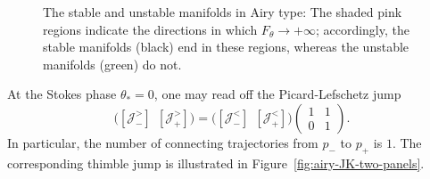 \documentclass[11pt]{amsart}
\theoremstyle{plain}
\newcommand{\J}{\mathcal J}
\begin{document}
\begin{figure}[H]
\vspace{0.8em}

\begin{center}
\end{center}

\caption{The stable and unstable manifolds in Airy type: The shaded pink regions indicate the directions in which \(F_\theta\to +\infty\); accordingly, the stable manifolds (black) end in these regions, whereas the unstable manifolds (green) do not.}
\label{fig:airy-three-phases}
\end{figure}

At the Stokes phase \(\theta_*=0\), one may read off the Picard-Lefschetz jump
\begin{equation*}\label{equ:Airyjump}
\bigl([\J_-^>] \ \ [\J_+^>]\bigr)
=
\bigl([\J_-^<] \ \ [\J_+^<]\bigr)
\begin{pmatrix}
1&1\\
0&1
\end{pmatrix}.
\end{equation*}
In particular, the number of connecting trajectories from $p_-$ to $p_+$ is $1$. The corresponding thimble jump is illustrated in  Figure~\ref{fig:airy-JK-two-panels}.
\end{document}
